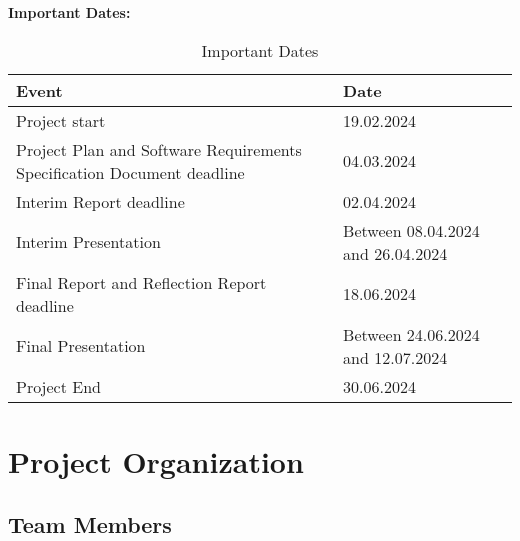 \documentclass[12pt,a4paper]{article}
\begin{document}
\newpage %

\begin{center} %
{\small\bfseries Important Dates:\par} %
\end{center}

\begin{table}[h!]
\centering
\begin{adjustbox}{scale=1,center}
\begin{tabular}{|p{10cm}|p{9cm}|} %
\hline
\textbf{Event} & \textbf{Date} \\
\hline
Project start & 19.02.2024 \\ \hline
Project Plan and Software Requirements Specification Document deadline & 04.03.2024 \\ \hline
Interim Report deadline & 02.04.2024 \\ \hline
Interim Presentation & Between 08.04.2024 and 26.04.2024 \\ \hline
Final Report and Reflection Report deadline & 18.06.2024 \\ \hline
Final Presentation & Between 24.06.2024 and 12.07.2024 \\ \hline
Project End & 30.06.2024 \\
\hline
\end{tabular}
\end{adjustbox}
\caption{Important Dates}
\end{table}





\vspace{\baselineskip} %

\section{Project Organization}
\subsection{Team Members}
\end{document}
